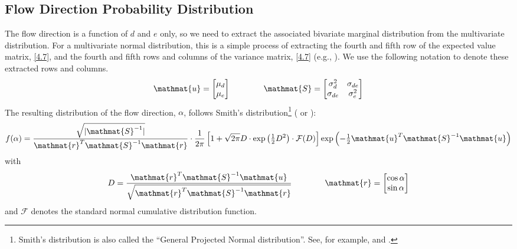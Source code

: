 \documentclass[12pt]{report}
\newcommand{\onehalf}{\textstyle \frac{1}{2} \displaystyle}
\newcommand{\mat}[1]{\mathmat{#1}}
\begin{document}
\subsection{Flow Direction Probability Distribution}
The flow direction is a function of $d$ and $e$ only, so we need to extract the associated bivariate marginal distribution from the multivariate distribution. For a multivariate normal distribution, this is a simple process of extracting the fourth and fifth row of the expected value matrix, \eqref{4.7}, and the fourth and fifth rows and columns of the variance matrix, \eqref{4.7} (e.g., \citet[Section 18.2, Theorem 3]{Roussas1973}). We use the following notation to denote these extracted rows and columns.
%
\begin{equation}\label{8.0.2}
    \mat{u} = \begin{bmatrix} \mu_{d} \\ \mu_{e} \end{bmatrix}
    \qquad \qquad
    \mat{S} = \begin{bmatrix} \sigma_{d}^2 & \sigma_{de} \\ \sigma_{de} & \sigma_{e}^2 \end{bmatrix}
\end{equation}
%
The resulting distribution of the flow direction, $\alpha$, follows Smith's distribution\footnote{Smith's distribution is also called the ``General Projected Normal distribution''. See, for example, \citet{Lark2014} and \citet{Hernandez2017}.} (\citet[Equation (4-11)]{Justus1978} or \citet[Equation (6)]{Carta2008}):
%
\begin{equation}\label{8.0.3}
	f(\alpha) =
    	\dfrac{\sqrt{|\mat{S}^{-1}|}}{\mat{r}^T \mat{S}^{-1} \mat{r}}
	\cdot \frac{1}{2\pi} \left[ 1 + \sqrt{2\pi} D \cdot \exp{\left(\onehalf D^2\right)} \cdot \mathcal{F}(D) \right]
	\exp{\left(-\onehalf \mat{u}^T \mat{S}^{-1} \mat{u} \right)}
\end{equation}
%
with
%
\begin{equation}\label{8.0.4}
	D = \frac{\mat{r}^T \mat{S}^{-1} \mat{u}}{\sqrt{\mat{r}^T \mat{S}^{-1} \mat{r} }}
    \qquad \qquad
    \mat{r} = \begin{bmatrix}\cos{\alpha} \\ \sin{\alpha}\end{bmatrix}
\end{equation}
%
and $\mathcal{F}$ denotes the standard normal cumulative distribution function.
\end{document}
